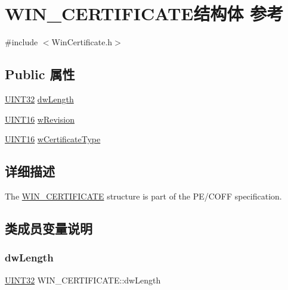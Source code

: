 \hypertarget{struct_w_i_n___c_e_r_t_i_f_i_c_a_t_e}{}\section{W\+I\+N\+\_\+\+C\+E\+R\+T\+I\+F\+I\+C\+A\+T\+E结构体 参考}
\label{struct_w_i_n___c_e_r_t_i_f_i_c_a_t_e}


{\ttfamily \#include $<$Win\+Certificate.\+h$>$}

\subsection*{Public 属性}
\begin{DoxyCompactItemize}
\item 
\hyperlink{_processor_bind_8h_ae1e6edbbc26d6fbc71a90190d0266018}{U\+I\+N\+T32} \hyperlink{struct_w_i_n___c_e_r_t_i_f_i_c_a_t_e_a75c71f0fa36205423a2bcdbb92a0e9b5}{dw\+Length}
\item 
\hyperlink{_processor_bind_8h_a09f1a1fb2293e33483cc8d44aefb1eb1}{U\+I\+N\+T16} \hyperlink{struct_w_i_n___c_e_r_t_i_f_i_c_a_t_e_a0c6bfd00e903eea3ba5fcbfbb3afd96d}{w\+Revision}
\item 
\hyperlink{_processor_bind_8h_a09f1a1fb2293e33483cc8d44aefb1eb1}{U\+I\+N\+T16} \hyperlink{struct_w_i_n___c_e_r_t_i_f_i_c_a_t_e_aa92a5b12fe2b12edf0f88828c18d8e56}{w\+Certificate\+Type}
\end{DoxyCompactItemize}


\subsection{详细描述}
The \hyperlink{struct_w_i_n___c_e_r_t_i_f_i_c_a_t_e}{W\+I\+N\+\_\+\+C\+E\+R\+T\+I\+F\+I\+C\+A\+TE} structure is part of the P\+E/\+C\+O\+FF specification. 

\subsection{类成员变量说明}
\mbox{\label{struct_w_i_n___c_e_r_t_i_f_i_c_a_t_e_a75c71f0fa36205423a2bcdbb92a0e9b5}} 
\subsubsection{\texorpdfstring{dw\+Length}{dwLength}}
{\footnotesize\ttfamily \hyperlink{_processor_bind_8h_ae1e6edbbc26d6fbc71a90190d0266018}{U\+I\+N\+T32} W\+I\+N\+\_\+\+C\+E\+R\+T\+I\+F\+I\+C\+A\+T\+E\+::dw\+Length}

